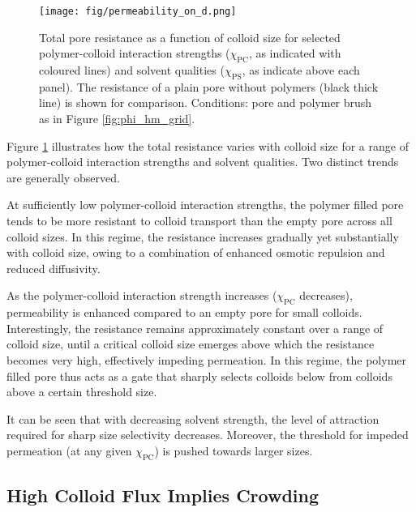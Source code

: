 \documentclass[12pt, a4paper]{article}
\begin{document}
\begin{figure}
    \centering
    \texttt{[image: fig/permeability\_on\_d.png]}
    \caption{
    Total pore resistance as a function of colloid size for selected polymer-colloid interaction strengths ($\chi_{\text{PC}}$, as indicated with coloured lines) 
    and solvent qualities ($\chi_{\text{PS}}$, as indicate above each panel). 
    The resistance of a plain pore without polymers (black thick line) is shown for comparison. 
    Conditions: pore and polymer brush as in Figure \ref{fig:phi_hm_grid}. 
    }
    \label{fig:R_vs_d}
\end{figure}

Figure \ref{fig:R_vs_d} illustrates how the total resistance varies with colloid size for a range of polymer-colloid interaction strengths and solvent qualities. 
Two distinct trends are generally observed.

At sufficiently low polymer-colloid interaction strengths, the polymer filled pore tends to be more resistant to colloid transport than the empty pore across  all colloid sizes. 
In this regime, the resistance increases gradually yet substantially with colloid size, owing to a combination of enhanced osmotic repulsion and reduced diffusivity.

As the polymer-colloid interaction strength increases ($\chi_{\text{PC}}$ decreases), permeability is enhanced compared to an empty pore for small colloids. 
Interestingly, the resistance remains approximately constant over a range of colloid size, until a critical colloid size emerges above which the resistance becomes very high, 
effectively impeding permeation. 
In this regime, the polymer filled pore thus acts as a gate that sharply selects colloids below from colloids above a certain threshold size.

It can be seen that with decreasing solvent strength, the level of attraction required for sharp size selectivity decreases. 
Moreover, the threshold for impeded permeation (at any given $\chi_{\text{PC}}$) is pushed towards larger sizes.


\subsection{High Colloid Flux Implies Crowding}
\end{document}
